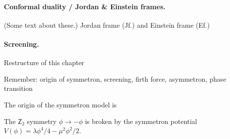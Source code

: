 








\paragraph{Conformal duality / Jordan \& Einstein frames.} %
(Some text about these.) Jordan frame (Jf.) and Einstein frame (Ef.) 


\paragraph{Screening.} %
\blahblah


\begin{bullets}
    \item Restructure of this chapter
    \item Remember: origin of symmetron, screening, firth force, asymmetron, phase transition
\end{bullets}


The origin of the symmetron model is \blahblah


The $\mathsf{Z}_2$ symmetry $\phi \to -\phi$ is broken by the symmetron potential $V(\phi)=\lambda\phi^4 / 4 - \mu^2\phi^2/2$. \citep{hinterbichlerScreeningLongRangeForces2010}


